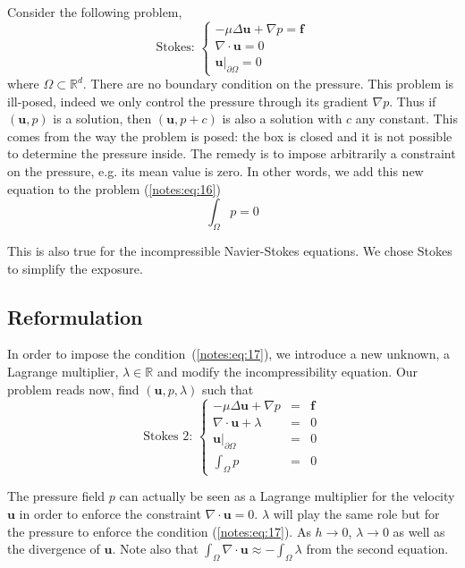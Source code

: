 Consider the following problem,
\begin{equation}
  \label{notes:eq:16}
  \mbox{Stokes: }\left\{
    \begin{array}{rcc}
      -\mu\Delta\mathbf{u} +
      \nabla p =
      \mathbf{f}\\
      \nabla\cdot\mathbf{u} = 0\\
      \mathbf{u}|_{\partial \Omega} = 0
    \end{array}
  \right.
\end{equation}
where $\Omega \subset \mathbb{R}^d$. There are no boundary condition
on the pressure. This problem is ill-posed, indeed we only control the
pressure through its gradient $\nabla p$. Thus if $(\mathbf{u},p)$ is
a solution, then $(\mathbf{u},p+c)$ is also a solution with $c$ any
constant. This comes from the way the problem is posed: the box is
closed and it is not possible to determine the pressure inside. The
remedy is to impose arbitrarily a constraint on the pressure, e.g. its
mean value is zero. In other words, we add this new equation to the
problem (\ref{notes:eq:16})
\begin{equation}
  \label{notes:eq:17}
  \int_\Omega p = 0
\end{equation}
\begin{remark}
  This is also true for the incompressible Navier-Stokes equations. We
  chose Stokes to simplify the exposure.
\end{remark}

\subsection{Reformulation}
  In order to impose the condition~(\ref{notes:eq:17}), we introduce a new
  unknown, a Lagrange multiplier, $\lambda \in \mathbb{R}$ and modify
  the incompressibility equation. Our problem reads now, find
  $(\mathbf{u},p,\lambda)$ such
  that
    \begin{equation}
      \label{notes:eq:18}
    \mbox{Stokes 2: }\left\{
      \begin{array}{rcl}
        -\mu\Delta\mathbf{u} +
        \nabla p &=&
        \mathbf{f}\\
        \nabla\cdot\mathbf{u} + \lambda &=& 0\\
        \mathbf{u}|_{\partial \Omega} &=& 0\\
        \int_\Omega p &=& 0
      \end{array}
    \right.
\end{equation}
\begin{remark}
  The pressure field $p$ can actually be seen as a Lagrange multiplier
  for the velocity $\mathbf{u}$ in order to enforce the constraint
  $\nabla \cdot \mathbf{u} = 0$. $\lambda$ will play the same role but
  for the pressure to enforce the condition (\ref{notes:eq:17}). As $h
  \rightarrow 0$, $\lambda \rightarrow 0$ as well as the divergence of
  $\mathbf{u}$. Note also that $\int_\Omega \nabla \cdot \mathbf{u}
  \approx - \int_\Omega \lambda$ from the second equation.
\end{remark}

